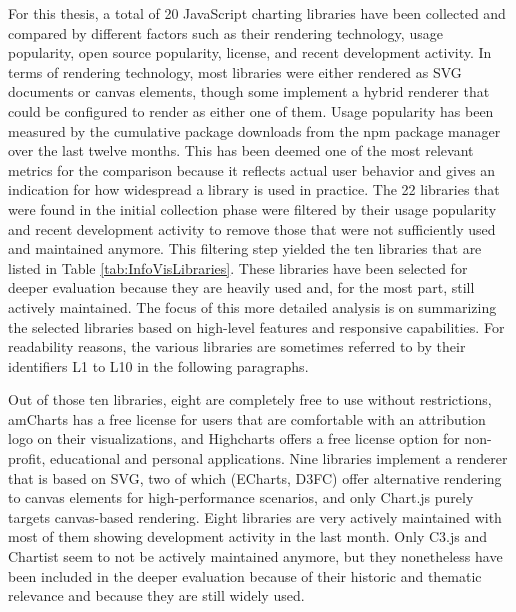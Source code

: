 For this thesis, a total of 20 JavaScript charting libraries have been collected and compared by different factors such as their rendering technology, usage popularity, open source popularity, license, and recent development activity. In terms of rendering technology, most libraries were either rendered as SVG documents or canvas elements, though some implement a hybrid renderer that could be configured to render as either one of them. Usage popularity has been measured by the cumulative package downloads from the npm package manager over the last twelve months. This has been deemed one of the most relevant metrics for the comparison because it reflects actual user behavior and gives an indication for how widespread a library is used in practice. The 22 libraries that were found in the initial collection phase were filtered by their usage popularity and recent development activity to remove those that were not sufficiently used and maintained anymore. This filtering step yielded the ten libraries that are listed in Table \ref{tab:InfoVisLibraries}. These libraries have been selected for deeper evaluation because they are heavily used and, for the most part, still actively maintained. The focus of this more detailed analysis is on summarizing the selected libraries based on high-level features and responsive capabilities. For readability reasons, the various libraries are sometimes referred to by their identifiers L1 to L10 in the following paragraphs.

Out of those ten libraries, eight are completely free to use without restrictions, amCharts has a free license for users that are comfortable with an attribution logo on their visualizations, and Highcharts offers a free license option for non-profit, educational and personal applications. Nine libraries implement a renderer that is based on SVG, two of which (ECharts, D3FC) offer alternative rendering to canvas elements for high-performance scenarios, and only Chart.js purely targets canvas-based rendering. Eight libraries are very actively maintained with most of them showing development activity in the last month. Only C3.js and Chartist seem to not be actively maintained anymore, but they nonetheless have been included in the deeper evaluation because of their historic and thematic relevance and because they are still widely used. 

